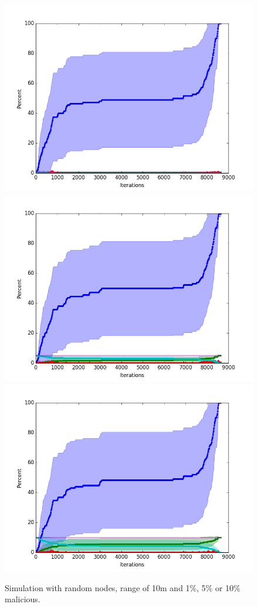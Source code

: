 \documentclass[conference]{IEEEtran}
\begin{document}
\begin{figure}
\centering
\includegraphics[width=0.329\linewidth]{Network_rA/10_1}
\includegraphics[width=0.329\linewidth]{Network_rA/10_5}
\includegraphics[width=0.329\linewidth]{Network_rA/10_10}
\caption{Simulation with random nodes, range of 10m and 1\%, 5\% or 10\% malicious.}
\label{fig:random0}
\end{figure}

%

\end{document}
